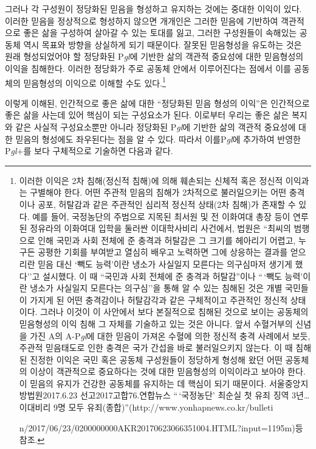 그러나 각 구성원이 정당화된 믿음을 형성하고 유지하는 것에는 중대한 이익이 있다. 이러한 믿음을 정상적으로 형성하지 않으면 개개인은 그러한 믿음에 기반하여 객관적으로 좋은 삶을 구성하여 살아갈 수 있는 토대를 잃고, 그러한 구성원들이 속해있는 공동체 역시 목표와 방향을 상실하게 되기 때문이다. 잘못된 믿음형성을 유도하는 것은 원래 형성되었어야 할 정당화된 P\emph{gl}에 기반한 삶의 객관적 중요성에 대한 믿음형성의 이익을 침해한다. 이러한 정당화가 주로 공동체 안에서 이루어진다는 점에서 이를 공동체의 믿음형성의 이익으로 이해할 수도 있다.\footnote{이러한 이익은 2차 침해(정신적 침해)에 의해 훼손되는 신체적 혹은 정신적 이익과는 구별해야 한다. 어떤 주관적 믿음의 침해가 2차적으로 불러일으키는 어떤 충격이나 공포, 허탈감과 같은 주관적인 심리적 정신적 상태(2차 침해)가 존재할 수 있다. 예를 들어, 국정농단의 주범으로 지목된 최서원 및 전 이화여대 총장 등이 연루된 정유라의 이화여대 입학을 둘러싼 이대학사비리 사건에서, 법원은 ``최씨의 범행으로 인해 국민과 사회 전체에 준 충격과 허탈감은 그 크기를 헤아리기 어렵고, 누구든 공평한 기회를 부여받고 열심히 배우고 노력하면 그에 상응하는 결과를 얻으리란 믿음 대신 `빽도 능력'이란 냉소가 사실일지 모른다는 의구심마저 생기게 했다''고 설시했다. 이 때 ``국민과 사회 전체에 준 충격과 허탈감''이나 ``\,`빽도 능력'이란 냉소가 사실일지 모른다는 의구심''을 통해 알 수 있는 침해된 것은 개별 국민들이 가지게 된 어떤 충격감이나 허탈감각과 같은 구체적이고 주관적인 정신적 상태이다. 그러나 이것이 이 사안에서 보다 본질적으로 침해된 것으로 보이는 공동체의 믿음형성의 이익 침해 그 자체를 기술하고 있는 것은 아니다. 앞서 수혈거부의 신념을 가진 A의 A-P\emph{gl}에 대한 믿음이 가져온 수혈에 의한 정신적 충격 사례에서 보듯, 주관적 믿음태도로 인한 충격은 국가 간섭을 바로 불러일으키지 않는다. 이 때 침해된 진정한 이익은 국민 혹은 공동체 구성원들이 정당하게 형성해 왔던 어떤 공동체의 이상이 객관적으로 중요하다는 것에 대한 믿음형성의 이익이라고 보아야 한다. 이 믿음의 유지가 건강한 공동체를 유지하는 데 핵심이 되기 때문이다. 서울중앙지방법원2017.6.23 선고2017고합76.연합뉴스 ``\,`국정농단' 최순실 첫 유죄 징역 3년\ldots 이대비리 9명 모두 유죄(종합)''(http://www.yonhapnews.co.kr/bulleti

  n/2017/06/23/0200000000AKR20170623066351004.HTML?input=1195m)등 참조.}

이렇게 이해된, 인간적으로 좋은 삶에 대한 ``정당화된 믿음 형성의 이익''은 인간적으로 좋은 삶을 사는데 있어 핵심이 되는 구성요소가 된다. 이로부터 우리는 좋은 삶은 복지와 같은 사실적 구성요소뿐만 아니라 정당화된 P\emph{gl}에 기반한 삶의 객관적 중요성에 대한 믿음의 형성에도 좌우된다는 점을 알 수 있다. 따라서 이를P\emph{gl}에 추가하여 반영한 P\emph{gl}+를 보다 구체적으로 기술하면 다음과 같다.

